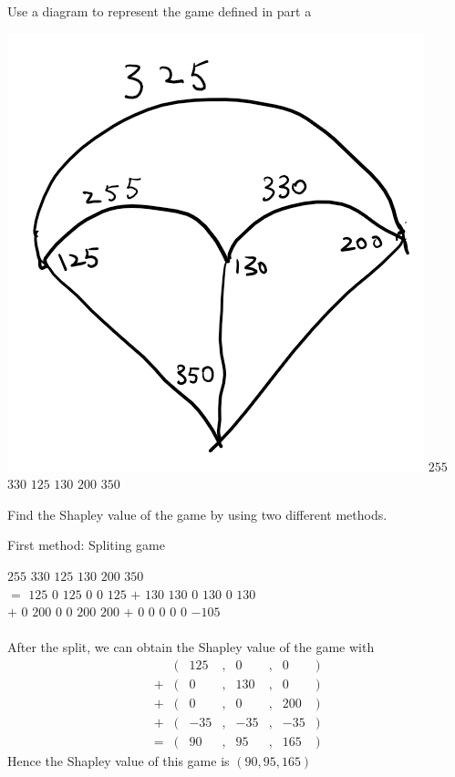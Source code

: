 \documentclass[12pt]{article}
\newenvironment{question}[2][Question]{\begin{trivlist}
\item[\hskip \labelsep {\bfseries #1}\hskip \labelsep {\bfseries #2.}]}{\end{trivlist}}
\newenvironment{answer}[2][Answer]{\begin{trivlist}
\item[\hskip \labelsep {\bfseries #1}\hskip \labelsep {\bfseries #2.}]}{\end{trivlist}}
\begin{document}
\begin{question}{1b}
	Use a diagram to represent the game defined in part a
\end{question}

\begin{answer}{1b}\end{answer}
\includegraphics[scale=0.5]{hku-ccst9017-assignment-4-img-001}
 {$255$} {$330$} {$125$} {$130$} {$200$} {$350$}

\begin{question}{1c}
	Find the Shapley value of the game by using two different methods.
\end{question}

\begin{answer}{1c}
	First method: Spliting game
\end{answer}
 {$255$} {$330$} {$125$} {$130$} {$200$} {$350$} \\
$=$ {$125$} {$0$} {$125$} {$0$} {$0$} {$125$}
$+$ {$130$} {$130$} {$0$} {$130$} {$0$} {$130$} \\
$+$ {$0$} {$200$} {$0$} {$0$} {$200$} {$200$}
$+$ {$0$} {$0$} {$0$} {$0$} {$0$} {$-105$} \\ \\
After the split, we can obtain the Shapley value of the game with
\begin{align*}
	  & ( & 125 & , & 0   & , & 0   & ) \\
	+ & ( & 0   & , & 130 & , & 0   & ) \\
	+ & ( & 0   & , & 0   & , & 200 & ) \\
	+ & ( & -35 & , & -35 & , & -35 & ) \\
	= & ( & 90  & , & 95  & , & 165 & )
\end{align*}
Hence the Shapley value of this game is $(90,95,165)$ \\
\end{document}
